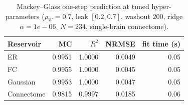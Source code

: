 \begin{table}[h]
    \centering
    \caption{Mackey--Glass one-step prediction at tuned hyper-parameters ($\rho_W{=}0.7$, leak $[0.2,0.7]$, washout $200$, ridge $\alpha{=}1e-06$, $N{=}234$, single-brain connectome).}
    \label{tab:mg_main}
    \begin{tabular}{lrrrr}
        \hline
        Reservoir & MC & $R^2$ & NRMSE & fit time (s) \\
        \hline
        ER & 0.9951 & 1.0000 & 0.0049 & 0.05 \\
        FC & 0.9955 & 1.0000 & 0.0045 & 0.05 \\
        Gaussian & 0.9953 & 1.0000 & 0.0047 & 0.05 \\
        Connectome & 0.9815 & 0.9997 & 0.0185 & 0.06 \\
        \hline
    \end{tabular}
\end{table}
